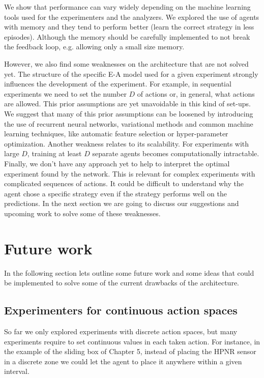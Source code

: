 \documentclass[11pt,a4paper,twoside]{report}
\newcommand{\+}{\textnormal{+} }
\theoremstyle{definition}
\numberwithin{equation}{chapter}
\begin{document}
We show that performance can vary widely depending on the machine learning tools
used for the experimenters and the analyzers. We explored the use of agents with
memory and they tend to perform better (learn the correct strategy in less
episodes). Although the memory should be carefully implemented to not break the
feedback loop, e.g. allowing only a small size memory.

However, we also find some weaknesses on the architecture that are not solved yet.
The structure of the specific E-A model used for a given experiment strongly
influences the development of the experiment. For example, in sequential
experiments we need to set the number $D$ of actions or, in general, what actions
are allowed. This prior assumptions are yet unavoidable in this kind of set-ups.
We suggest that many of this prior assumptions can be loosened by
introducing the use of recurrent neural networks, variational methods and
common machine learning techniques, like automatic feature selection or
hyper-parameter optimization. Another weakness relates to its scalability. For
experiments with large $D$, training at least $D$ separate agents becomes 
computationally intractable. Finally, we don't have any approach yet to help to
interpret the optimal experiment found by the network. This is relevant
for complex experiments with complicated sequences of actions. It could be
difficult to understand why the agent chose a specific strategy even if 
the strategy performs well on the predictions. In the next section we are going
to discuss our suggestions and upcoming work to solve some of these weaknesses.

\section{Future work}

In the following section lets outline some future work and some ideas that could
be implemented to solve some of the current drawbacks of the architecture.
\subsection{Experimenters for continuous action spaces}
So far we only explored experiments with discrete action spaces, but many
experiments require to set continuous values in each taken action.
For instance, in the example of the sliding box of Chapter 5, instead of placing 
the HPNR sensor in a discrete zone we could let the agent to place it anywhere
within a given interval. 
\end{document}
